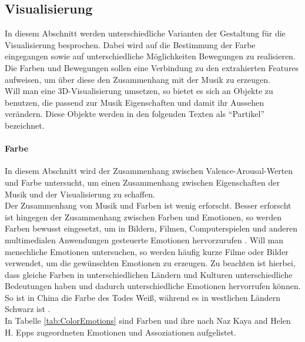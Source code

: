 \documentclass[11pt,a4paper]{article}
\begin{document}
\subsection{Visualisierung}
In diesem Abschnitt werden unterschiedliche Varianten der Gestaltung für die Visualisierung besprochen. Dabei wird auf die Bestimmung der Farbe eingegangen sowie auf unterschiedliche Möglichkeiten Bewegungen zu realisieren. Die Farben und Bewegungen sollen eine Verbindung zu den extrahierten Features aufweisen, um über diese den Zusammenhang mit der Musik zu erzeugen.\\
Will man eine 3D-Visualisierung umsetzen, so bietet es sich an Objekte zu benutzen, die passend zur Musik Eigenschaften
und damit ihr Aussehen verändern. Diese Objekte werden in den folgenden Texten als ``Partikel'' bezeichnet.

\paragraph{Farbe}
In diesem Abschnitt wird der Zusammenhang zwischen Valence-Arousal-Werten und Farbe untersucht, um einen Zusammenhang zwischen Eigenschaften der Musik und der Visualisierung zu schaffen.\\
Der Zusammenhang von Musik und Farben ist wenig erforscht. Besser erforscht ist hingegen der Zusammenhang zwischen Farben und Emotionen, so werden Farben bewusst eingesetzt, um in Bildern, Filmen, Computerspielen und anderen multimedialen Anwendungen gesteuerte Emotionen hervorzurufen \cite{10.3389/fpsyg.2017.00440}. Will man menschliche Emotionen untersuchen, so werden häufig kurze Filme oder Bilder verwendet, um die gewünschten Emotionen zu erzeugen. Zu beachten ist hierbei, dass gleiche Farben in unterschiedlichen Ländern und Kulturen unterschiedliche Bedeutungen haben und dadurch unterschiedliche Emotionen hervorrufen können. So ist in China die Farbe des Todes Weiß, während es in westlichen Ländern Schwarz ist  \cite[S. 3]{c0f471f7e6a618d880cf25175c9f99ac97ef8ba7d016c7f8c523f8d902892d9e}.\\
In Tabelle \ref{tab:ColorEmotions} sind Farben und ihre nach Naz Kaya and Helen H. Epps
 \cite{c0f471f7e6a618d880cf25175c9f99ac97ef8ba7d016c7f8c523f8d902892d9e} zugeordneten Emotionen und Assoziationen aufgelistet.
\end{document}
